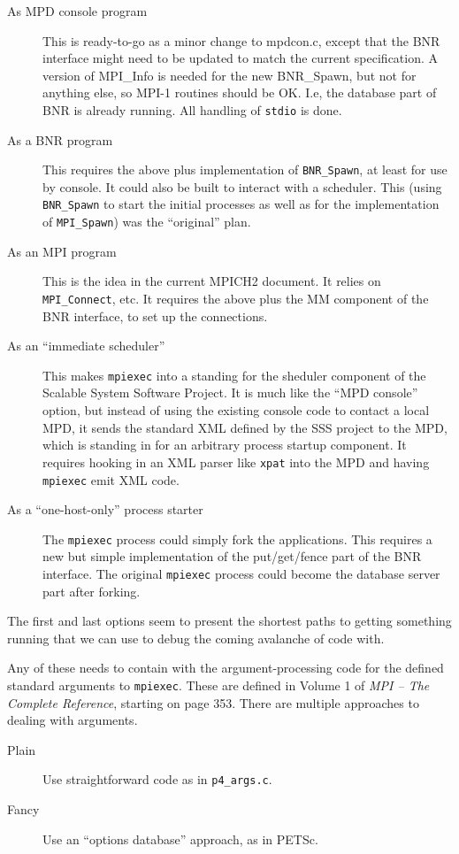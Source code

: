 \documentclass{article}
\def\code#1{\texttt{#1}}
\begin{document}
\begin{description}
\item[As MPD console program] This is ready-to-go as a minor change to
  mpdcon.c, except that the BNR interface might need to be updated to match
  the current specification.  A version of MPI_Info is needed for the new
  BNR_Spawn, but not for anything else, so MPI-1 routines should be OK.  I.e,
  the database part of BNR is already running.  All handling of \code{stdio}
  is done.
\item[As a BNR program] This requires the above plus implementation of
  \code{BNR_Spawn}, at least for use by console.  It could also be built to interact
  with a scheduler.  This (using \code{BNR_Spawn} to start the initial processes as
  well as for the implementation of \code{MPI_Spawn}) was the ``original''
  plan.
\item[As an MPI program] This is the idea in the current MPICH2 document.  It
  relies on \code{MPI_Connect}, etc.  It requires the above plus the MM component
  of the BNR interface, to set up the connections.  
\item[As an ``immediate scheduler''] This makes \code{mpiexec} into a standing
  for the sheduler component of the Scalable System Software Project.  It is
  much like the ``MPD console'' option, but instead of using the existing
  console code to contact a local MPD, it sends the standard XML defined by
  the SSS project to the MPD, which is standing in for an arbitrary process
  startup component.  It requires hooking in an XML parser like \code{xpat}
  into the MPD and having \code{mpiexec} emit XML code.
\item[As a ``one-host-only'' process starter] The \code{mpiexec} process could
  simply fork the applications.  This requires a new but simple implementation
  of the put/get/fence part of the BNR interface.  The original \code{mpiexec}
  process could become the database server part after forking.
\end{description}

The first and last options seem to present the shortest paths to getting
something running that we can use to debug the coming avalanche of code with.

Any of these needs to contain with the argument-processing code for the defined
standard arguments to \code{mpiexec}.  These are defined in Volume 1 of {\em
  MPI -- The Complete Reference}, starting on page 353.  There are multiple
approaches to dealing with arguments.
\begin{description}
\item[Plain] Use straightforward code as in \code{p4_args.c}.
\item[Fancy] Use an ``options database'' approach, as in PETSc.
\end{description}
\end{document}
